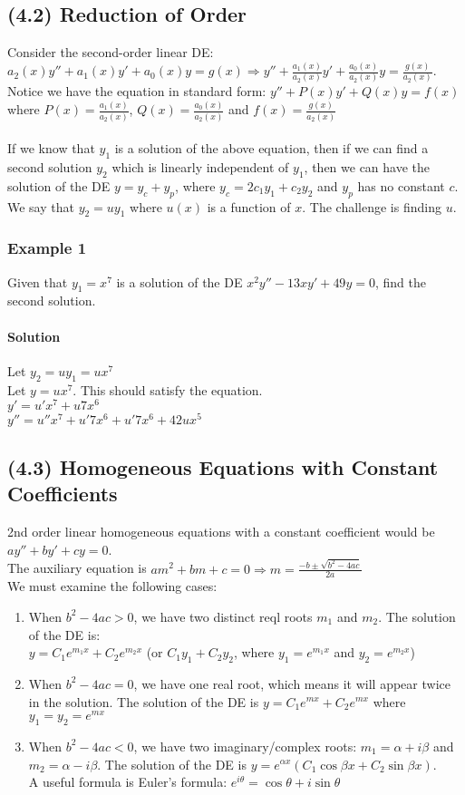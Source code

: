 \documentclass{article}
\begin{document}
\subsection{(4.2) Reduction of Order}
Consider the second-order linear DE: $a_2(x)y''+a_1(x)y'+a_0(x)y=g(x)\Rightarrow
y''+\frac{a_1(x)}{a_2(x)}y'+\frac{a_0(x)}{a_2(x)}y=\frac{g(x)}{a_2(x)}$.
\\Notice we have the equation in standard form: $y''+P(x)y'+Q(x)y=f(x)$ where $P(x)=\frac{a_1(x)}{a_2(x)}$,
$Q(x)=\frac{a_0(x)}{a_2(x)}$ and $f(x)=\frac{g(x)}{a_2(x)}$
\\\\If we know that $y_1$ is a solution of the above equation, then if we can find a second solution
$y_2$ which is linearly independent of $y_1$, then we can have the solution of the DE $y=y_c+y_p$, where $y_c=2c_1y_1+c_2y_2$
and $y_p$ has no constant $c$.
\\We say that $y_2=uy_1$ where $u(x)$ is a function of $x$. The challenge is finding $u$.

\subsubsection{Example 1}
Given that $y_1=x^7$ is a solution of the DE $x^2y''-13xy'+49y=0$, find the second solution.
\paragraph{Solution} Let $y_2=uy_1=ux^7$
\\Let $y=ux^7$. This should satisfy the equation.
\\$y'=u'x^7+u7x^6$
\\$y''=u''x^7+u'7x^6+u'7x^6+42ux^5$



\subsection{(4.3) Homogeneous Equations with Constant Coefficients}
2nd order linear homogeneous equations with a constant coefficient would be $ay''+by'+cy=0$.
\\The auxiliary equation is $am^2+bm+c=0\Rightarrow m=\frac{-b\pm\sqrt{b^2-4ac}}{2a}$
\\We must examine the following cases:
\begin{enumerate}
    \item When $b^2-4ac>0$, we have two distinct reql roots $m_1$ and $m_2$. The solution of the DE is:\\$y=C_1e^{m_1x}+C_2e^{m_2x}$ (or $C_1y_1+C_2y_2$, where $y_1=e^{m_1x}$ and $y_2=e^{m_2x}$)
    \item When $b^2-4ac=0$, we have one real root, which means it will appear twice in the solution.
    The solution of the DE is $y=C_1e^{mx}+C_2e^{mx}$ where $y_1=y_2=e^{mx}$
    \item When $b^2-4ac<0$, we have two imaginary/complex roots: $m_1=\alpha+i\beta$ and $m_2=\alpha-i\beta$.
    The solution of the DE is $y=e^{\alpha x}(C_1\cos{\beta x}+C_2\sin{\beta x})$.
    \\A useful formula is Euler's formula: $e^{i\theta}=\cos\theta+i\sin\theta$
\end{enumerate}
\end{document}
